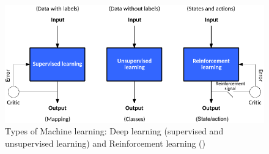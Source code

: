 
\begin{figure}[ht]
	\centering
	\includegraphics[width=\linewidth]{figures/ml-techniques}
	\caption{Types of Machine learning: Deep learning (supervised and unsupervised learning) and Reinforcement learning (\cite{jones2017models})}
	\label{fig:ml-types}
\end{figure}

